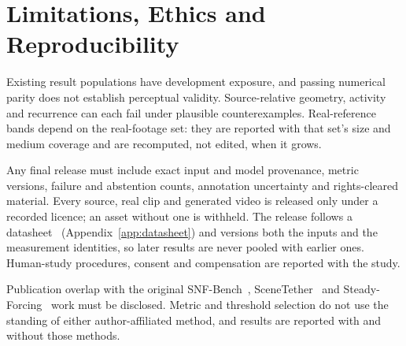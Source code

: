 \section{Limitations, Ethics and Reproducibility}
\label{sec:limitations}
Existing result populations have development exposure, and passing numerical parity does not establish perceptual validity. Source-relative geometry, activity and recurrence can each fail under plausible counterexamples. Real-reference bands depend on the real-footage set: they are reported with that set's size and medium coverage and are recomputed, not edited, when it grows.

Any final release must include exact input and model provenance, metric versions, failure and abstention counts, annotation uncertainty and rights-cleared material. Every source, real clip and generated video is released only under a recorded licence; an asset without one is withheld. The release follows a datasheet~\cite{gebru2021datasheets} (Appendix~\ref{app:datasheet}) and versions both the inputs and the measurement identities, so later results are never pooled with earlier ones. Human-study procedures, consent and compensation are reported with the study. 

Publication overlap with the original SNF-Bench~\cite{minar2026snfbench}, SceneTether~\cite{scenetether2026} and Steady-Forcing~\cite{minar2025steady} work must be disclosed. Metric and threshold selection do not use the standing of either author-affiliated method, and results are reported with and without those methods.
